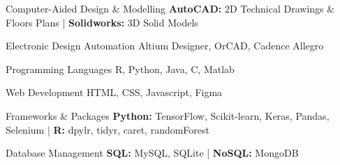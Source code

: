 

\begin{cvskills}

 \cvskill
    {Computer-Aided Design \& Modelling} %
    {\textbf{AutoCAD:} 2D  Technical Drawings \&  Floors Plans | \textbf{Solidworks:} 3D Solid Models} %


  \cvskill
    {Electronic Design Automation} %
    {Altium Designer, OrCAD, Cadence Allegro} %





  \cvskill
    {Programming Languages} %
    {R, Python, Java, C, Matlab} %













  \cvskill
    {Web Development} %
    {HTML, CSS, Javascript, Figma} %

  \cvskill
    {Frameworks \& Packages } %
    {\textbf{Python:} TensorFlow, Scikit-learn, Keras, Pandas, Selenium | \textbf{R:} dpylr, tidyr, caret, randomForest } %



 \cvskill
   {Database Management} %
  {\textbf{SQL: }MySQL, SQLite | \textbf{NoSQL:} MongoDB } %



\end{cvskills}
